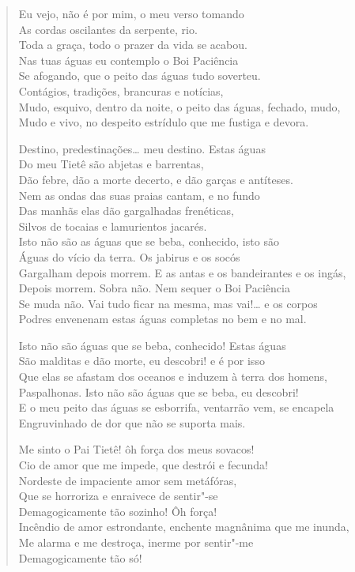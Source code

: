 \begin{verse}
Eu vejo, não é por mim, o meu verso tomando\\
As cordas oscilantes da serpente, rio.\\
Toda a graça, todo o prazer da vida se acabou.\\
Nas tuas águas eu contemplo o Boi Paciência\\
Se afogando, que o peito das águas tudo soverteu.\\
Contágios, tradições, brancuras e notícias,\\
Mudo, esquivo, dentro da noite, o peito das águas, fechado, mudo,\\
Mudo e vivo, no despeito estrídulo que me fustiga e devora.

Destino, predestinações\ldots{} meu destino. Estas águas\\
Do meu Tietê são abjetas e barrentas,\\
Dão febre, dão a morte decerto, e dão garças e antíteses.\\
Nem as ondas das suas praias cantam, e no fundo\\
Das manhãs elas dão gargalhadas frenéticas,\\
Silvos de tocaias e lamurientos jacarés.\\
Isto não são as águas que se beba, conhecido, isto são\\
Águas do vício da terra. Os jabirus e os socós\\
Gargalham depois morrem. E as antas e os bandeirantes e os ingás,\\
Depois morrem. Sobra não. Nem sequer o Boi Paciência\\
Se muda não. Vai tudo ficar na mesma, mas vai!\ldots{} e os corpos\\
Podres envenenam estas águas completas no bem e no mal.

Isto não são águas que se beba, conhecido! Estas águas\\
São malditas e dão morte, eu descobri! e é por isso\\
Que elas se afastam dos oceanos e induzem à terra dos homens,\\
Paspalhonas. Isto não são águas que se beba, eu descobri!\\
E o meu peito das águas se esborrifa, ventarrão vem, se encapela\\
Engruvinhado de dor que não se suporta mais.

Me sinto o Pai Tietê! ôh força dos meus sovacos!\\
Cio de amor que me impede, que destrói e fecunda!\\
Nordeste de impaciente amor sem metáfóras,\\
Que se horroriza e enraivece de sentir"-se\\
Demagogicamente tão sozinho! Ôh força!\\
Incêndio de amor estrondante, enchente magnânima que me inunda,\\
Me alarma e me destroça, inerme por sentir"-me\\
Demagogicamente tão só!


\end{verse}
